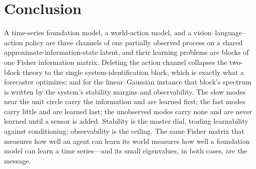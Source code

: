 \documentclass[10pt]{article}
\theoremstyle{plain}
\theoremstyle{definition}
\theoremstyle{remark}
\begin{document}
\section{Conclusion}
\label{sec:conclusion}
A time-series foundation model, a world-action model, and a
vision--language--action policy are three channels of one partially observed
process on a shared approximate-information-state latent, and their learning
problems are blocks of one Fisher information matrix. Deleting the action channel
collapses the two-block theory to the single system-identification block, which is
exactly what a forecaster optimizes; and for the linear--Gaussian instance that
block's spectrum is written by the system's stability margins and observability.
The slow modes near the unit circle carry the information and are learned first;
the fast modes carry little and are learned last; the unobserved modes carry none
and are never learned until a sensor is added. Stability is the master dial,
trading learnability against conditioning; observability is the ceiling. The same
Fisher matrix that measures how well an agent can learn its world measures how
well a foundation model can learn a time series---and its small eigenvalues, in
both cases, are the message.
\end{document}
